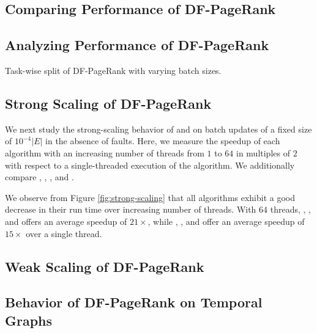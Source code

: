 \subsection{Comparing Performance of DF-PageRank}

\subsection{Analyzing Performance of DF-PageRank}

Task-wise split of DF-PageRank with varying batch sizes.

\subsection{Strong Scaling of DF-PageRank}

We next study the strong-scaling behavior of \FroWbar{} and \FroBarf{} on batch updates of a fixed size of $10^{-4} |E|$ in the absence of faults. Here, we measure the speedup of each algorithm with an increasing number of threads from $1$ to $64$ in multiples of $2$ with respect to a single-threaded execution of the algorithm. We additionally compare \StaWbar{}, \StaBarf{}, \NaiWbar{}, and \NaiBarf{}.

We observe from Figure \ref{fig:strong-scaling} that all algorithms exhibit a good decrease in their run time over increasing number of threads. With $64$ threads, \StaBarf{}, \NaiBarf{}, and \FroBarf{} offers an average speedup of $21\times$, while \StaWbar{}, \NaiWbar{}, and \FroWbar{} offer an average speedup of $15\times$ over a single thread.


\subsection{Weak Scaling of DF-PageRank}

\subsection{Behavior of DF-PageRank on Temporal Graphs}
